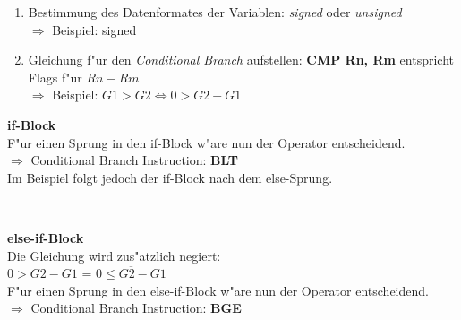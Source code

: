 \begin{enumerate}
	\item Bestimmung des Datenformates der Variablen: \textit{signed} oder \textit{unsigned}\\
			$\Rightarrow$ Beispiel: signed
	\item Gleichung f"ur den \textit{Conditional Branch} aufstellen: \textbf{CMP Rn, Rm} entspricht Flags f"ur $Rn-Rm$\\
			$\Rightarrow$ Beispiel: $G1 > G2 \Leftrightarrow  0 > G2-G1$
\end{enumerate}
    
\begin{minipage}{9cm}
	\textbf{if-Block}\\
	F"ur einen Sprung in den if-Block w"are nun der Operator \color{red} \circled{$>$} \color{black} entscheidend.\\
	$\Rightarrow$ Conditional Branch Instruction: \textbf{BLT}\\
	Im Beispiel folgt jedoch der if-Block nach dem else-Sprung.
\end{minipage}
%
\begin{minipage}{0.5cm}
	\-\
\end{minipage}
%
\begin{minipage}{9cm}
	\textbf{else-if-Block}\\
	Die Gleichung wird zus"atzlich negiert:\\
	$0 > G2-G1$ = $\overline{0 \leq G2-G1}$\\
	F"ur einen Sprung in den else-if-Block w"are nun der Operator \color{red} \circled{$\leq$} \color{black} entscheidend.\\
	$\Rightarrow$ Conditional Branch Instruction: \textbf{BGE}
\end{minipage}

